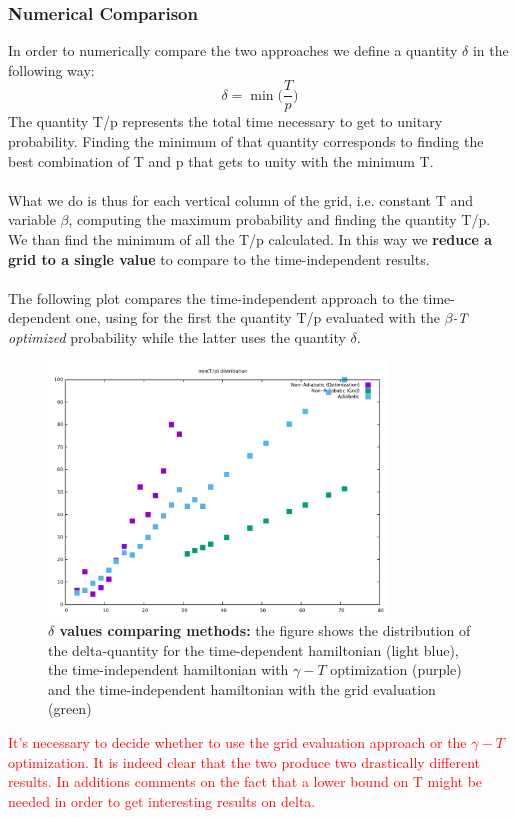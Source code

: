 \documentclass[aps,pra,reprint, onecolumn]{revtex4-2}
\newcommand{\red}[1]{\textcolor{red}{#1}}
\begin{document}
\subsubsection{\textbf{Numerical Comparison}}
In order to numerically compare the two approaches we define a quantity $\delta$ in the following way:
\begin{equation}
  \delta = \min\Big(\frac{T}{p}\Big)
\end{equation}
The quantity T/p represents the total time necessary to get to unitary probability. Finding the minimum of that quantity corresponds to finding the best combination of T and p that gets to unity with the minimum T. \\ \\
What we do is thus for each vertical column of the grid, i.e. constant T and variable $\beta$, computing the maximum probability and finding the quantity T/p. We than find the minimum of all the T/p calculated. In this way we \textbf{reduce a grid to a single value} to compare to the time-independent results. \\ \\
The following plot compares the time-independent approach to the time-dependent one, using for the first the quantity T/p evaluated with the \textit{$\beta$-T optimized} probability while the latter uses the quantity $\delta$. \\

\begin{figure}[ht]
\includegraphics[width=9cm]{./figures/delta.pdf}%
\caption{\textbf{$\delta$ values comparing methods:} the figure shows the distribution of the delta-quantity for the time-dependent hamiltonian (light blue), the time-independent hamiltonian with $\gamma-T$ optimization (purple) and the time-independent hamiltonian with the grid evaluation (green)}
\end{figure}
\red{It's necessary to decide whether to use the grid evaluation approach or the $\gamma-T$ optimization. It is indeed clear that the two produce two drastically different results. In additions comments on the fact that a lower bound on T might be needed in order to get interesting results on delta.}
\end{document}
